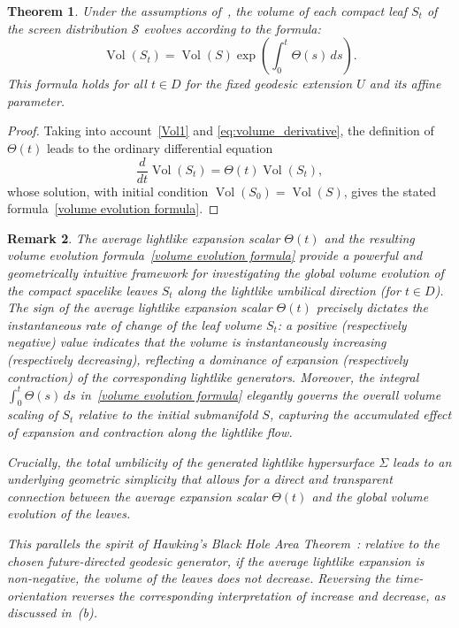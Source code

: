 \documentclass[11pt]{article}
\numberwithin{equation}{section}
\newtheorem{theorem}{Theorem}[section]
\newtheorem{remark}[theorem]{Remark}
\begin{document}
	\begin{theorem}\label{propo:volume evolution formula}
		Under the assumptions of~, the volume of each compact leaf $S_t$ of the screen distribution ${\mathcal S}$ evolves according to the formula:
		\begin{equation}\label{volume evolution formula}
			\operatorname{Vol}(S_t) = \operatorname{Vol}(S) \exp\left( \int_0^t \Theta(s) \,ds \right).
		\end{equation}
		This formula holds for all $t \in D$ for the fixed geodesic extension $U$ and its affine parameter.
	\end{theorem}
\begin{proof}
Taking into account~\eqref{Vol1} and \eqref{eq:volume_derivative}, the definition of \(\Theta(t)\) leads to the ordinary differential equation
	\[
	\frac{d}{dt} \operatorname{Vol}(S_t) = \Theta(t) \operatorname{Vol}(S_t),
	\]
	whose solution, with initial condition $\operatorname{Vol}(S_0) = \operatorname{Vol}(S)$, gives the stated formula~\eqref{volume evolution formula}.
\end{proof}
	


\begin{remark}\normalfont
	The average lightlike expansion scalar \(\Theta(t)\) and the resulting volume evolution formula~\eqref{volume evolution formula} provide a powerful and geometrically intuitive framework for investigating the global volume evolution of the compact spacelike leaves \(S_t\) along the lightlike umbilical direction (for \(t \in D\)). The sign of the average lightlike expansion scalar \(\Theta(t)\) precisely dictates the instantaneous rate of change of the leaf volume \(S_t\): a positive (respectively negative) value indicates that the volume is instantaneously increasing (respectively decreasing), reflecting a dominance of expansion (respectively contraction) of the corresponding lightlike generators. Moreover, the integral \(\int_0^t \Theta(s) \, ds\) in~\eqref{volume evolution formula} elegantly governs the \emph{overall} volume scaling of \(S_t\) relative to the initial submanifold \(S\), capturing the accumulated effect of expansion and contraction along the lightlike flow.
	
	Crucially, the total umbilicity of the generated lightlike hypersurface \(\Sigma\) leads to an underlying geometric simplicity that allows for a direct and transparent connection between the average expansion scalar \(\Theta(t)\) and the global volume evolution of the leaves.
	
	This parallels the spirit of Hawking's Black Hole Area Theorem~\cite{HawkingEllis, Wald}: relative to the chosen future-directed geodesic generator, if the average lightlike expansion is non-negative, the volume of the leaves does not decrease. Reversing the time-orientation reverses the corresponding interpretation of increase and decrease, as discussed in~(b).
\end{remark}
\end{document}
